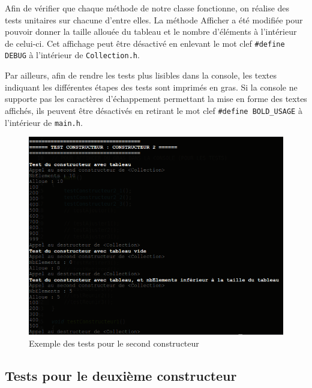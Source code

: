 \documentclass[11pt]{article}
\begin{document}
Afin de vérifier que chaque méthode de notre classe fonctionne, on réalise des tests unitaires sur chacune d'entre elles. La méthode Afficher a été modifiée pour pouvoir donner la taille allouée du tableau et le nombre d'éléments à l'intérieur de celui-ci. Cet affichage peut être désactivé en enlevant le mot clef \texttt{\#define DEBUG} à l'intérieur de \texttt{Collection.h}.

Par ailleurs, afin de rendre les tests plus lisibles dans la console, les textes indiquant les différentes étapes des tests sont imprimés en gras. Si la console ne supporte pas les caractères d'échappement permettant la mise en forme des textes affichés, ils peuvent être désactivés en retirant le mot clef \texttt{\#define~BOLD\_USAGE} à l'intérieur de \texttt{main.h}.

\begin{figure}[htp]
\centering
\includegraphics[scale=0.60]{TestConstructeurs.png}
\caption{Exemple des tests pour le second constructeur}
\label{testConstructeur}
\end{figure}

\subsection{Tests pour le deuxième constructeur}
\end{document}
